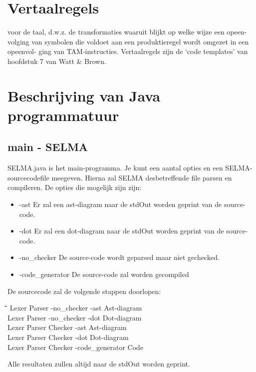 \documentclass[]{article}
\begin{document}

\newpage
\section{Vertaalregels}
voor de taal, d.w.z. de transformaties waaruit blijkt op welke wijze een opeen-
volging van symbolen die voldoet aan een produktieregel wordt omgezet in een opeenvol-
ging van TAM-instructies. Vertaalregels zijn de ‘code templates’ van hoofdstuk 7 van Watt
\& Brown.

\newpage
\section{Beschrijving van Java programmatuur}
%
%
\subsection{main - SELMA}
SELMA.java is het main-programma. Je kunt een aantal opties en een SELMA-sourcecodefile meegeven.
Hierna zal SELMA desbetreffende file parsen en compileren. De opties die mogelijk zijn zijn:
\begin{itemize}
\item -ast Er zal een ast-diagram naar de stdOut worden geprint van de source-code.
\item -dot Er zal een dot-diagram naar de stdOut worden geprint van de source-code.
\item -no\_checker De source-code wordt geparsed maar niet gechecked.
\item -code\_generator De source-code zal worden gecompiled
\end{itemize}
De sourcecode zal de volgende stappen doorlopen: \\
\begin{tabbing}
\hspace{5em}\=\hspace{5em}\=\hspace{7em}\=\hspace{5em}\=\hspace{10em}\=\kill
Lexer \>  Parser \> -no\_checker 	\>   		\> -ast \>  Ast-diagram \\
Lexer \>  Parser \> -no\_checker 	\>   		\> -dot \>  Dot-diagram \\
Lexer \>  Parser \>  				\>  Checker \> -ast \>  Ast-diagram \\
Lexer \>  Parser \>  				\>  Checker \> -dot \>  Dot-diagram \\
Lexer \>  Parser \>  				\>  Checker \> -code\_generator \>  Code 
\end{tabbing} 
Alle resultaten zullen altijd naar de stdOut worden geprint.
\end{document}
